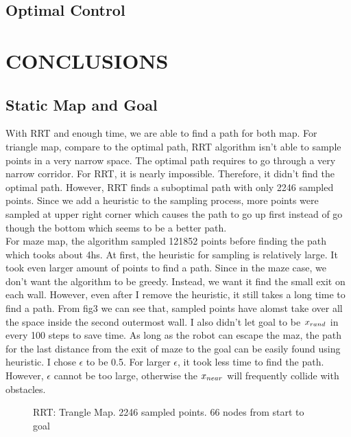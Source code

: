 \documentclass[letterpaper, 10 pt, conference]{ieeeconf}  %
\begin{document}
\subsection{Optimal Control}


\section{CONCLUSIONS}
\subsection{Static Map and Goal}
With RRT and enough time, we are able to find a path for both map. For triangle map, compare to the optimal path, RRT algorithm
isn't able to sample points in a very narrow space. The optimal path requires to go through a very narrow corridor. For RRT, it is 
nearly impossible. Therefore, it didn't find the optimal path. However, RRT finds a suboptimal path with only 2246
sampled points. Since we add a heuristic to the sampling process, more points were sampled at upper right corner which causes the
path to go up first instead of go though the bottom which seems to be a better path. \\

For maze map, the algorithm sampled 121852 points before finding the path which tooks about 4hs. At first, the heuristic for sampling
is relatively large. It took even larger amount of points to find a path. Since in the maze case, we don't want the algorithm to be 
greedy. Instead, we want it find the small exit on each wall. However, even after I remove the heuristic, it still takes a long time
to find a path. From fig3 we can see that, sampled points have alomst take over all the space inside the second outermost wall.
I also didn't let goal to be $x_{rand}$ in every 100 steps to save time. As long as the robot can escape the maz, the path for 
the last distance from the exit of maze to the goal can be easily found using heuristic. I chose $\epsilon$ to be 0.5. For 
larger $\epsilon$, it took less time to find the path. However, $\epsilon$ cannot be too large, otherwise the $x_{near}$ will frequently 
collide with obstacles. 

\begin{figure}[h]
    \centering
    \caption{RRT: Trangle Map. 2246 sampled points. 66 nodes from start to goal}
    \label{fig:map1}
 \end{figure}
\end{document}
